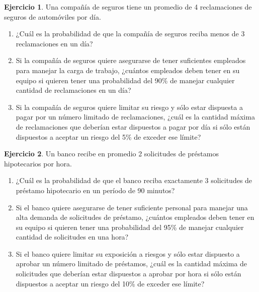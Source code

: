 \documentclass[
]{book}
\providecommand{\tightlist}{%
  \setlength{\itemsep}{0pt}\setlength{\parskip}{0pt}}
\theoremstyle{definition}
\theoremstyle{definition}
\theoremstyle{definition}
\newtheorem{exercise}{Ejercicio}[chapter]
\theoremstyle{definition}
\theoremstyle{remark}
\begin{document}
\begin{exercise}

Una compañía de seguros tiene un promedio de 4 reclamaciones de seguros de automóviles por día.

\begin{enumerate}
\def\labelenumi{\arabic{enumi}.}
\tightlist
\item
  ¿Cuál es la probabilidad de que la compañía de seguros reciba menos de 3 reclamaciones en un día?
\item
  Si la compañía de seguros quiere asegurarse de tener suficientes empleados para manejar la carga de trabajo, ¿cuántos empleados deben tener en su equipo si quieren tener una probabilidad del 90\% de manejar cualquier cantidad de reclamaciones en un día?
\item
  Si la compañía de seguros quiere limitar su riesgo y sólo estar dispuesta a pagar por un número limitado de reclamaciones, ¿cuál es la cantidad máxima de reclamaciones que deberían estar dispuestos a pagar por día si sólo están dispuestos a aceptar un riesgo del 5\% de exceder ese límite?
\end{enumerate}

\end{exercise}

\begin{exercise}

Un banco recibe en promedio 2 solicitudes de préstamos hipotecarios por hora.

\begin{enumerate}
\def\labelenumi{\arabic{enumi}.}
\tightlist
\item
  ¿Cuál es la probabilidad de que el banco reciba exactamente 3 solicitudes de préstamo hipotecario en un período de 90 minutos?
\item
  Si el banco quiere asegurarse de tener suficiente personal para manejar una alta demanda de solicitudes de préstamo, ¿cuántos empleados deben tener en su equipo si quieren tener una probabilidad del 95\% de manejar cualquier cantidad de solicitudes en una hora?
\item
  Si el banco quiere limitar su exposición a riesgos y sólo estar dispuesto a aprobar un número limitado de préstamos, ¿cuál es la cantidad máxima de solicitudes que deberían estar dispuestos a aprobar por hora si sólo están dispuestos a aceptar un riesgo del 10\% de exceder ese límite?
\end{enumerate}

\end{exercise}
\end{document}

